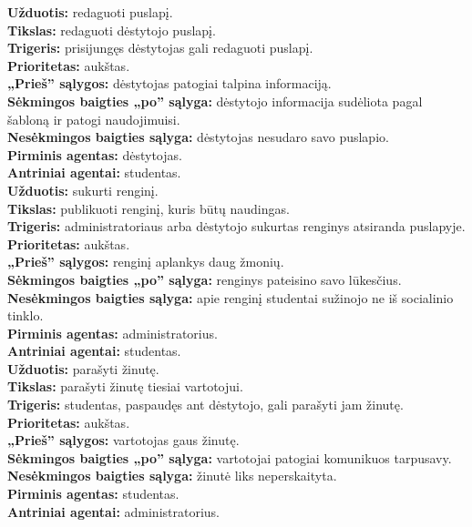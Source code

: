 \documentclass{VUMIFPSkursinis}
\begin{document}
\setlength{\parindent}{0pt}\textbf{Užduotis:} redaguoti puslapį. \\
\textbf{Tikslas:} redaguoti dėstytojo puslapį.\\
\textbf{Trigeris:} prisijungęs dėstytojas gali redaguoti puslapį. \\
\textbf{Prioritetas:} aukštas. \\
\textbf{„Prieš” sąlygos:} dėstytojas patogiai talpina informaciją.\\
\textbf{Sėkmingos baigties „po” sąlyga:} dėstytojo informacija sudėliota pagal šabloną ir patogi naudojimuisi. \\
\textbf{Nesėkmingos baigties sąlyga:} dėstytojas nesudaro savo puslapio. \\
\textbf{Pirminis agentas:} dėstytojas. \\
\textbf{Antriniai agentai:} studentas. \\

\setlength{\parindent}{0pt}\textbf{Užduotis:} sukurti renginį. \\
\textbf{Tikslas:} publikuoti renginį, kuris būtų naudingas.\\
\textbf{Trigeris:} administratoriaus arba dėstytojo sukurtas renginys atsiranda puslapyje. \\
\textbf{Prioritetas:} aukštas. \\
\textbf{„Prieš” sąlygos:} renginį aplankys daug žmonių.\\
\textbf{Sėkmingos baigties „po” sąlyga:} renginys pateisino savo lūkesčius. \\
\textbf{Nesėkmingos baigties sąlyga:} apie renginį studentai sužinojo ne iš socialinio tinklo. \\
\textbf{Pirminis agentas:} administratorius. \\
\textbf{Antriniai agentai:} studentas. \\


\setlength{\parindent}{0pt}\textbf{Užduotis:} parašyti žinutę. \\
\textbf{Tikslas:} parašyti žinutę tiesiai vartotojui.\\
\textbf{Trigeris:} studentas, paspaudęs ant dėstytojo, gali parašyti jam žinutę. \\
\textbf{Prioritetas:} aukštas. \\
\textbf{„Prieš” sąlygos:} vartotojas gaus žinutę.\\
\textbf{Sėkmingos baigties „po” sąlyga:} vartotojai patogiai komunikuos tarpusavy. \\
\textbf{Nesėkmingos baigties sąlyga:} žinutė liks neperskaityta. \\
\textbf{Pirminis agentas:} studentas. \\
\textbf{Antriniai agentai:} administratorius.\\
\end{document}

